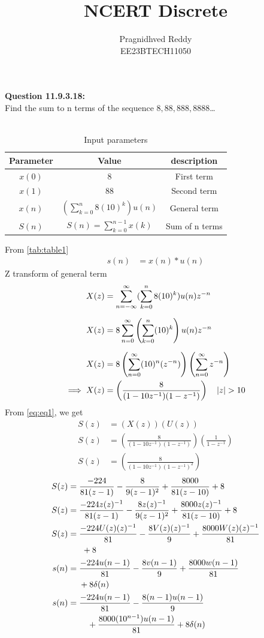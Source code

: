 \documentclass[journal,12pt,twocolumn]{IEEEtran}
\title{NCERT Discrete}
\author{Pragnidhved Reddy\\EE23BTECH11050}
\date{}
\begin{document}
\maketitle
\newpage
\bigskip
\textbf{Question 11.9.3.18:}\\
 Find the sum to n terms of the sequence $8,88,888,8888$\ldots\\
 \solution \\
 \begin{table}[H]
\centering
\setlength{\extrarowheight}{8pt}
\begin{tabular}{|c|c|c|}\hline
\textbf{Parameter} & \textbf{Value} & \textbf{description}\\ \hline
$x(0)$ & 8 & First term \\ \hline
$x(1)$ & 88 & Second term \\ \hline 
$x(n)$ & $(\sum^{n}_{k=0}8(10)^k)u(n)$ & General term \\ \hline
$S(n)$ & $S(n)=\sum^{n-1}_{k=0}x(k)$ & Sum of n terms \\ \hline
\end{tabular}
\caption{Input parameters}
\label{tab:table1}
\end{table}
 From \eqref{tab:table1}
\begin{align}
\label{eq:eq1}
 s(n)&=x(n)* u(n)
 \end{align}
 Z transform of general term
 \begin{align}
 X(z)&=\sum_{n=-\infty}^{\infty}(\sum_{k=0}^{n}8(10)^k)u(n)z^{-n}\\[6pt]
 X(z)&=8\sum_{n=0}^{\infty}\left(\sum_{k=0}^{n}(10)^k\right)u(n)z^{-n}\\[6pt]
 X(z)&=8\left(\sum_{n=0}^{\infty}(10)^n(z^{-n})\right)\left(\sum_{n=0}^{\infty}z^{-n}\right)\\
 \implies X(z)&=\left(\frac{8}{(1-10z^{-1})(1-z^{-1})}\right) \quad \left\vert z\right\vert>10
\end{align}
From \eqref{eq:eq1}, we get
 \begin{align}
 S(z)&=(X(z))(U(z))\\
 S(z)&=\left(\frac{8}{(1-10z^{-1})(1-z^{-1})}\right)\left(\frac{1}{1-z^{-1}}\right)\\[6pt]
 S(z)&=\left(\frac{8}{(1-10z^{-1})(1-z^{-1})^2}\right)
\end{align}
\begin{align}
 S(z)&=\frac{-224}{81(z-1)}-\frac{8}{9(z-1)^2}+\frac{8000}{81(z-10)}+8\\
 S(z)&=\frac{-224z(z)^{-1}}{81(z-1)}-\frac{8z(z)^{-1}}{9(z-1)^2}+\frac{8000z(z)^{-1}}{81(z-10)}+8\\
 \notag S(z)&=\frac{-224U(z)(z)^{-1}}{81}-\frac{8V(z)(z)^{-1}}{9}+\frac{8000W(z)(z)^{-1}}{81}\\&~~~~~
 +8\\
 \notag s(n)&=\frac{-224u(n-1)}{81}-\frac{8v(n-1)}{9}+\frac{8000w(n-1)}{81}\\&~~~~
 +8\delta (n)\\
 \notag s(n)&=\frac{-224u(n-1)}{81}-\frac{8(n-1)u(n-1)}{9}\\&~~~~~~~
 +\frac{8000(10^{n-1})u(n-1)}{81}+8\delta (n)\\ 
\end{align}
\end{document}

